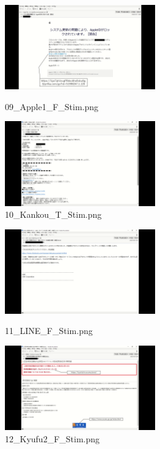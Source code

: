 \documentclass[a4paper,11pt]{ltjsreport}
\begin{document}
\begin{figure}[H]
	\centering
	\begin{minipage}{0.45\linewidth}
		\centering
		\includegraphics[width=6.5cm]{img/stimuli/09_Apple1_F_Stim.png}
		\caption{09\_Apple1\_F\_Stim.png}
		\label{fig:a9}
	\end{minipage}
	\begin{minipage}{0.45\linewidth}
		\centering
		\includegraphics[width=6.5cm]{img/stimuli/10_Kankou_T_Stim.png}
		\caption{10\_Kankou\_T\_Stim.png}
		\label{fig:a10}
	\end{minipage}
\end{figure}

\begin{figure}[H]
	\centering
	\begin{minipage}{0.45\linewidth}
		\centering
		\includegraphics[width=6.5cm]{img/stimuli/11_LINE_F_Stim.png}
		\caption{11\_LINE\_F\_Stim.png}
		\label{fig:a11}
	\end{minipage}
	\begin{minipage}{0.45\linewidth}
		\centering
		\includegraphics[width=6.5cm]{img/stimuli/12_Kyufu2_F_Stim.png}
		\caption{12\_Kyufu2\_F\_Stim.png}
		\label{fig:a12}
	\end{minipage}
\end{figure}
\end{document}
